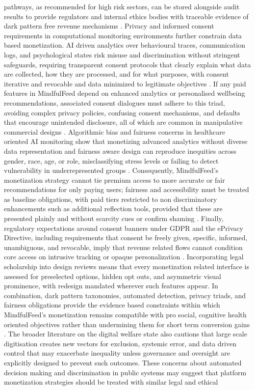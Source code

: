 \documentclass{article}
\begin{document}
pathways, as recommended for high risk sectors, can be stored alongside audit results to provide regulators and internal ethics bodies with traceable evidence of dark pattern free revenue mechanisms \parencites[8]{4807303}. Privacy and informed consent requirements in computational monitoring environments further constrain data based monetization. AI driven analytics over behavioural traces, communication logs, and psychological states risk misuse and discrimination without stringent safeguards, requiring transparent consent protocols that clearly explain what data are collected, how they are processed, and for what purposes, with consent iterative and revocable and data minimized to legitimate objectives \parencites[18]{8760542}. If any paid features in MindfulFeed depend on enhanced analytics or personalised wellbeing recommendations, associated consent dialogues must adhere to this triad, avoiding complex privacy policies, confusing consent mechanisms, and defaults that encourage unintended disclosure, all of which are common in manipulative commercial designs \parencites[18]{8760542}[2]{2668071}. Algorithmic bias and fairness concerns in healthcare oriented AI monitoring show that monetizing advanced analytics without diverse data representation and fairness aware design can reproduce inequities across gender, race, age, or role, misclassifying stress levels or failing to detect vulnerability in underrepresented groups \parencites[18]{8760542}. Consequently, MindfulFeed's monetization strategy cannot tie premium access to more accurate or fair recommendations for only paying users; fairness and accessibility must be treated as baseline obligations, with paid tiers restricted to non discriminatory enhancements such as additional reflection tools, provided that these are presented plainly and without scarcity cues or confirm shaming \parencites[18]{8760542}[5127387]{5127387}. Finally, regulatory expectations around consent banners under GDPR and the ePrivacy Directive, including requirements that consent be freely given, specific, informed, unambiguous, and revocable, imply that revenue related flows cannot condition core access on intrusive tracking or opaque personalization \parencites[4]{5678011}. Incorporating legal scholarship into design reviews means that every monetization related interface is assessed for preselected options, hidden opt outs, and asymmetric visual prominence, with redesign mandated wherever such features appear. In combination, dark pattern taxonomies, automated detection, privacy triads, and fairness obligations provide the evidence based constraints within which MindfulFeed's monetization remains compatible with pro social, cognitive health oriented objectives rather than undermining them for short term conversion gains \parencites[2]{4807303}[2]{5127387}[4]{5678011}[18]{8760542}. The broader literature on the digital welfare state also cautions that large scale digitisation creates new vectors for exclusion, systemic error, and data driven control that may exacerbate inequality unless governance and oversight are explicitly designed to prevent such outcomes. These concerns about automated decision making and discrimination in public systems may suggest that platform monetization strategies should be treated with similar legal and ethical 
\end{document}
